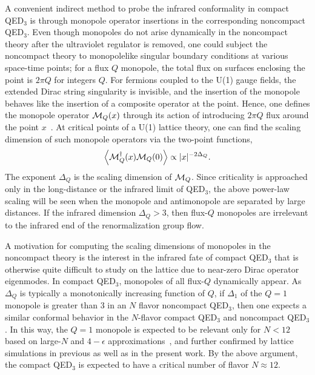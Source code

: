 \documentclass[prd, onecolumn, superscriptaddress, nofootinbib, notitlepage, floatfix]{revtex4-1}
\newcommand\beq{\begin{equation}}
\newcommand\eeq[1]{\label{#1}\end{equation}}
\begin{document}
A convenient indirect method to probe the infrared conformality in
compact QED$_3$ is through monopole operator insertions in the corresponding
noncompact QED$_3$.  Even though monopoles do not arise dynamically
in the noncompact theory after the ultraviolet regulator is removed, 
one could subject the noncompact theory to monopolelike singular
boundary conditions at various space-time points;
for a flux $Q$ monopole, the total flux on surfaces enclosing the
point is $2\pi Q$ for integers $Q$. For fermions coupled to the
U(1) gauge fields, the extended Dirac string singularity is invisible, and the
insertion of the monopole behaves like the insertion of a composite
operator at the point. Hence, one defines the monopole operator
${\cal M}_Q(x)$ through its action of introducing  $2\pi Q$ flux
around the point $x$~\cite{Borokhov:2002ib}. At critical points of a U(1) lattice theory, 
one can find the scaling dimension of such monopole operators via the two-point functions,
\beq
\left\langle {\cal M}^\dagger_Q(x) {\cal M}_Q(0)\right\rangle \propto |x|^{-2\Delta_Q}.
\eeq{mono2pt}
The exponent $\Delta_Q$ is the scaling dimension of ${\cal M}_Q$.
Since criticality is approached only in the long-distance or the infrared limit of
QED$_3$, the above power-law scaling will be seen when the monopole
and antimonopole are separated by large distances.  If the infrared
dimension $\Delta_Q >3$, then flux-$Q$ monopoles are irrelevant
to the infrared end of the renormalization group flow.

A motivation for computing the scaling dimensions of monopoles in
the noncompact theory is
the interest in the infrared fate of compact QED$_3$ that is otherwise quite 
difficult to study on the lattice due to near-zero Dirac operator eigenmodes. 
In compact QED$_3$, monopoles of all
flux-$Q$ dynamically appear.  As $\Delta_Q$ is typically a monotonically
increasing function of $Q$, if $\Delta_1$ of the $Q=1$ monopole is
greater than 3 in an $N$ flavor noncompact QED$_3$, then one expects
a similar conformal behavior in the $N$-flavor compact QED$_3$ and
noncompact QED$_3$. In this way, the $Q=1$ monopole is expected to
be relevant only for $N<12$ based on large-$N$ and $4-\epsilon$ approximations~\cite{Pufu:2013vpa,Chester:2015wao}, and
further confirmed by lattice simulations in previous as well as in
the present work. By the above argument, the compact QED$_3$ is
expected to have a critical number of flavor $N\approx 12$.
\end{document}
